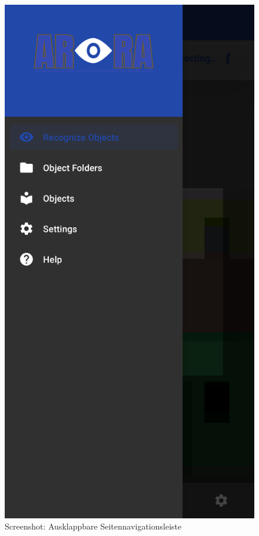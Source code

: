 \documentclass[oneside]{ausarbeitung}
\begin{document}
\begin{figure}[hptb]
	\centering
	\includegraphics[height=0.6\textheight]{images/screenshots/side-nav.png}
	\caption{Screenshot: Ausklappbare Seitennavigationsleiste}
	\label{fig:screenshot:side-nav}
\end{figure}
\end{document}
